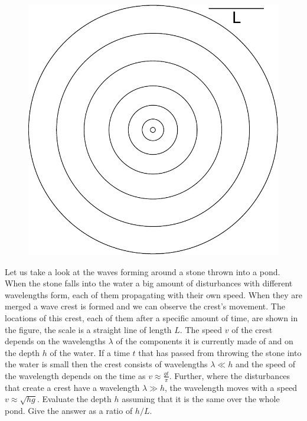 \documentclass[11pt]{article}
\begin{document}
\probeng
\begin{figure}%
\includegraphics[width=\linewidth]{2013-v3g-06-lained}%
\end{figure}
Let us take a look at the waves forming around a stone thrown into a pond. When the stone falls into the water a big amount of disturbances with different wavelengths form, each of them propagating with their own speed. When they are merged a wave crest is formed and we can observe the crest’s movement. The locations of this crest, each of them after a specific amount of time, are shown in the figure, the scale is a straight line of length $L$. The speed $v$ of the crest depends on the wavelengths $\lambda$ of the components it is currently made of and on the depth $h$ of the water. If a time $t$ that has passed from throwing the stone into the water is small then the crest consists of wavelengths $\lambda \ll h$ and the speed of the wavelength depends on the time as $v \approx \frac{gt}{\pi}$. Further, where the disturbances that create a crest have a wavelength $\lambda \gg h$, the wavelength moves with a speed $v
\approx \sqrt{hg}$. Evaluate the depth $h$ assuming that it is the same over the whole pond. Give the answer as a ratio of $h/L$.
\probend
\bigskip

\end{document}
